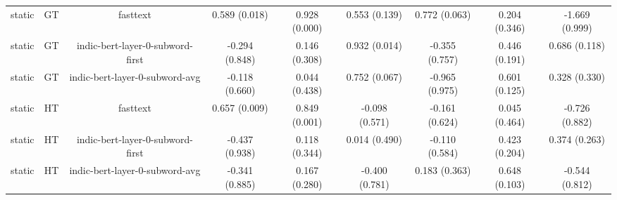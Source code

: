 \begin{sidewaystable}[htb]
\begin{tabular}{@{}ccccccccc@{}}
        static & GT & fasttext & 0.589 (0.018) & 0.928 (0.000) & 0.553 (0.139) & 0.772 (0.063) & 0.204 (0.346) & -1.669 (0.999) \\
        static & GT & indic-bert-layer-0-subword-first & -0.294 (0.848) & 0.146 (0.308) & 0.932 (0.014) & -0.355 (0.757) & 0.446 (0.191) & 0.686 (0.118) \\
        static & GT & indic-bert-layer-0-subword-avg & -0.118 (0.660) & 0.044 (0.438) & 0.752 (0.067) & -0.965 (0.975) & 0.601 (0.125) & 0.328 (0.330) \\
        static & HT & fasttext & 0.657 (0.009) & 0.849 (0.001) & -0.098 (0.571) & -0.161 (0.624) & 0.045 (0.464) & -0.726 (0.882) \\
        static & HT & indic-bert-layer-0-subword-first & -0.437 (0.938) & 0.118 (0.344) & 0.014 (0.490) & -0.110 (0.584) & 0.423 (0.204) & 0.374 (0.263) \\
        static & HT & indic-bert-layer-0-subword-avg & -0.341 (0.885) & 0.167 (0.280) & -0.400 (0.781) & 0.183 (0.363) & 0.648 (0.103) & -0.544 (0.812) \\
        \bottomrule
    \end{tabular}
\end{sidewaystable}